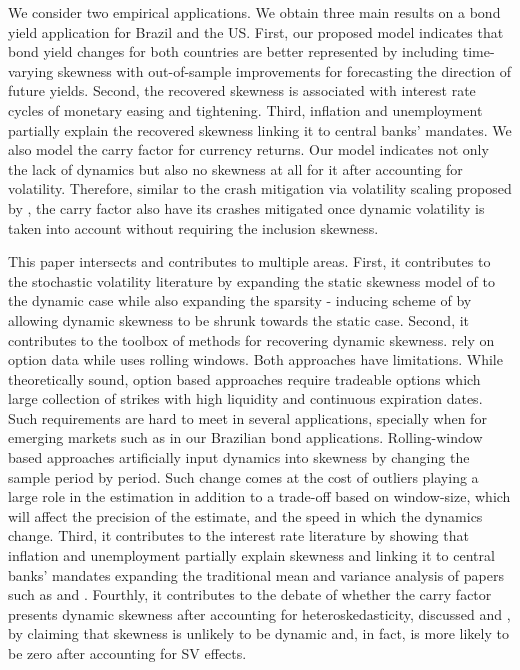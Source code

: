 \documentclass{article}
\begin{document}
We consider two empirical applications. We obtain three main results on a bond yield application for Brazil and the US. First, our proposed model indicates that bond yield changes for both countries are better represented by including time-varying skewness with out-of-sample improvements for forecasting the direction of future yields. Second, the recovered skewness is associated with interest rate cycles of monetary easing and tightening. Third, inflation and unemployment partially explain the recovered skewness linking it to central banks' mandates. We also model the carry factor for currency returns. Our model indicates not only the lack of dynamics but also no skewness at all for it after accounting for volatility. Therefore, similar to the crash mitigation via volatility scaling proposed by \cite{barroso2015momentum}, the carry factor also have its crashes mitigated once dynamic volatility is taken into account without requiring the inclusion skewness.

This paper intersects and contributes to multiple areas. First, it contributes to the stochastic volatility literature by expanding the static skewness model of \cite{nakajima2012stochastic} to the dynamic case while also expanding the sparsity - inducing scheme of \cite{nakajima2020skew} by allowing dynamic skewness to be shrunk towards the static case. Second, it contributes to the toolbox of methods for recovering dynamic skewness. \cite{trolle2014swaption} rely on option data while \cite{rafferty2012currency} uses rolling windows. Both approaches have limitations. While theoretically sound, option based approaches require tradeable options which large collection of strikes with high liquidity and continuous expiration dates. Such requirements are hard to meet in several applications, specially when for emerging markets such as in our Brazilian bond applications. Rolling-window based approaches artificially input dynamics into skewness by changing the sample period by period. Such change comes at the cost of outliers playing a large role in the estimation in addition to a trade-off based on window-size, which will affect the precision of the estimate, and the speed in which the dynamics change. Third, it contributes to the interest rate literature by showing that inflation and unemployment partially explain skewness and linking it to central banks' mandates expanding the traditional mean and variance analysis of papers such as \cite{litterman1991common} and \cite{joslin2018can}. Fourthly, it contributes to the debate of whether the carry factor presents dynamic skewness after accounting for heteroskedasticity, discussed \cite{burnside2011peso} and \cite{jurek2014crash}, by claiming that skewness is unlikely to be dynamic and, in fact, is more likely to be zero after accounting for SV effects. 
\end{document}
